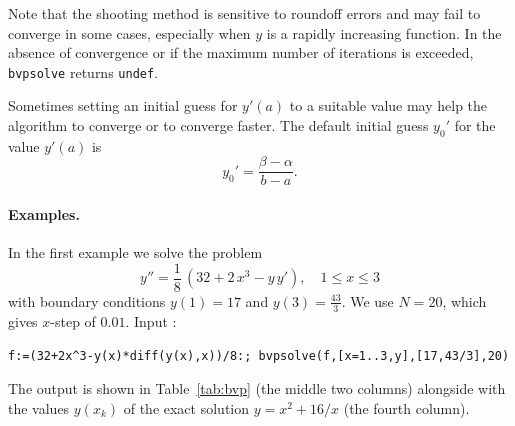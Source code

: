 \documentclass[a4paper,11pt]{book}
\begin{document}
Note that the shooting method is sensitive to roundoff errors and may fail to converge in some cases, especially when $y$ is a rapidly increasing function. In the absence of convergence or if the maximum number of iterations is exceeded, {\tt bvpsolve} returns {\tt undef}.

Sometimes setting an initial guess for $y'(a)$ to a suitable value may help the algorithm to converge or to converge faster. The default initial guess $y_0'$ for the value $y'(a)$ is\[ y_0'=\frac{\beta-\alpha}{b-a}. \]

\paragraph{Examples.}
In the first example we solve the problem \[y''=\frac{1}{8}\,(32+2\,x^3-y\,y'),\quad 1\leq x\leq 3\] with boundary conditions $y(1)=17$ and $y(3)=\frac{43}{3}$. We use $N=20$, which gives $x$-step of $0.01$. Input :
\begin{center}
  \tt f:=(32+2x\verb|^|3-y(x)*diff(y(x),x))/8:; bvpsolve(f,[x=1..3,y],[17,43/3],20)
\end{center}
The output is shown in Table~\ref{tab:bvp} (the middle two columns) alongside with the values $y(x_k)$ of the exact solution $y=x^2+16/x$ (the fourth column).
\end{document}
